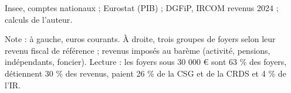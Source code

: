 Insee, comptes nationaux ; Eurostat (PIB) ; DGFiP, IRCOM revenus 2024 ; calculs de l'auteur.\par Note : à gauche, euros courants. À droite, trois groupes de foyers selon leur revenu fiscal de référence ; revenus imposés au barème (activité, pensions, indépendants, foncier). Lecture : les foyers sous 30 000 \euro{} sont 63 \% des foyers, détiennent 30 \% des revenus, paient 26 \% de la CSG et de la CRDS et 4 \% de l'IR.
